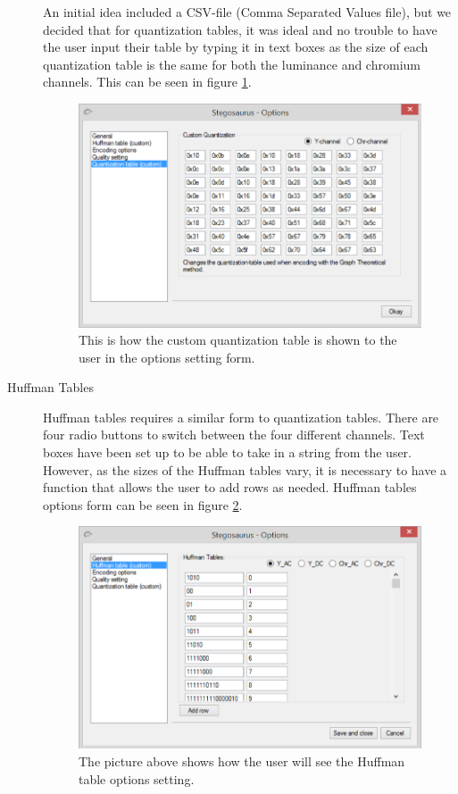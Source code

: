 \begin{description}
An initial idea included a CSV-file (Comma Separated Values file), but we decided that for quantization tables, it was ideal and no trouble to have the user input their table by typing it in text boxes as the size of each quantization table is the same for both the luminance and chromium channels. This can be seen in figure \ref{fig:StegoOptionQuant}.


\begin{figure}
	\centering
	\includegraphics[width=1\textwidth]{figures/StegoOptionQuant.png}
	\caption{This is how the custom quantization table is shown to the user in the options setting form.}
	\label{fig:StegoOptionQuant}
\end{figure}

\item[Huffman Tables]

Huffman tables requires a similar form to quantization tables. There are four radio buttons to switch between the four different channels. Text boxes have been set up to be able to take in a string from the user. However, as the sizes of the Huffman tables vary, it is necessary to have a function that allows the user to add rows as needed. Huffman tables options form can be seen in figure \ref{fig:StegoOptionHuff2}.


\begin{figure}
	\centering
	\includegraphics[width=1\textwidth]{figures/StegoOptionHuff2.png}
	\caption{The picture above shows how the user will see the Huffman table options setting.}
	\label{fig:StegoOptionHuff2}
\end{figure}


\end{description}
